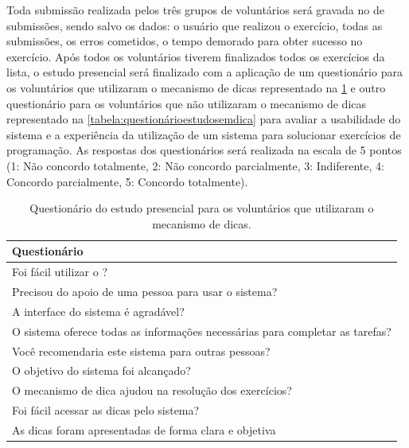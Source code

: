 Toda submissão realizada pelos três grupos de voluntários será gravada no  de submissões, sendo salvo os dados: o usuário que realizou o exercício, todas as submissões, os erros cometidos, o tempo demorado para obter sucesso no exercício. Após todos os voluntários tiverem finalizados todos os exercícios da lista, o estudo presencial será finalizado com a aplicação de um questionário para os voluntários que utilizaram o mecanismo de dicas representado na \cref{tabela:questionárioestudocomdica} e outro questionário para os voluntários que não utilizaram o mecanismo de dicas representado na \cref{tabela:questionárioestudosemdica} para avaliar a usabilidade do sistema e a experiência da utilização de um sistema  para solucionar exercícios de programação. As respostas dos questionários será realizada na escala  de 5 pontos (1: Não concordo totalmente, 2: Não concordo parcialmente, 3: Indiferente, 4: Concordo parcialmente, 5: Concordo totalmente).

\begin{table}[ht]
	\centering
	\captionsetup{justification=centering}
	\caption{Questionário do estudo presencial para os voluntários que utilizaram o mecanismo de dicas.}
	\label{tabela:questionárioestudocomdica}
	\begin{tabular}{l}
		\hline
		Questionário                        											\\ \hline
		Foi fácil utilizar o \foreign{iHint}?                            				\\
		Precisou do apoio de uma pessoa para usar o sistema?                           	\\
		A interface do sistema é agradável?                        						\\
		O sistema oferece todas as informações necessárias para completar as tarefas?   \\
		Você recomendaria este sistema para outras pessoas?                           	\\
		O objetivo do sistema foi alcançado? 											\\ 
		O mecanismo de dica ajudou na resolução dos exercícios?							\\
		Foi fácil acessar as dicas pelo sistema?										\\
		As dicas foram apresentadas de forma clara e objetiva							\\ \hline
	\end{tabular}
\end{table}

